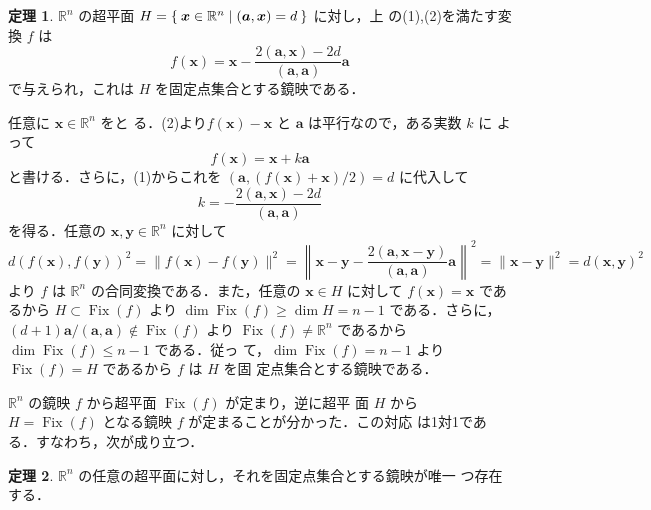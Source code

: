 \documentclass[11pt, uplatex, dvipdfmx, titlepage]{jsarticle}
\makeatletter
\DeclareMathOperator{\Fix}{Fix}
\renewenvironment{proof}[1][\proofname]{\par
  \pushQED{\qed}%
  \normalfont \topsep6\p@\@plus6\p@\relax
  \trivlist
  \item[\hskip\labelsep
         \bfseries
    {#1}]\ignorespaces
}{%
  \popQED\endtrivlist\@endpefalse
}
\theoremstyle{definition}
\newtheorem{theorem}{定理}[section]
\renewcommand{\proofname}{\textbf{証明}}
\makeatother
\begin{document}
\begin{theorem}\label{thm:ref-equation}
  $\mathbb{R}^n$ の超平面
  $H=\Set{\bm{x} \in \mathbb{R}^n | (\bm{a}, \bm{x})=d}$ に対し，上
  の(1),(2)を満たす変換 $f$ は
  \[
    f(\bm{x}) = \bm{x} - \frac{2(\bm{a}, \bm{x}) - 2d}{(\bm{a}, \bm{a})} \bm{a}
  \]
  で与えられ，これは $H$ を固定点集合とする鏡映である．
\end{theorem}
\begin{proof}
  任意に $\bm{x} \in \mathbb{R}^n$ をと
  る．(2)より$f(\bm{x})-\bm{x}$ と $\bm{a}$ は平行なので，ある実数 $k$ に
  よって
  \[
    f(\bm{x}) = \bm{x} + k \bm{a}
  \]
  と書ける．さらに，(1)からこれを $\left( \bm{a}, \left(f(\bm{x})+\bm{x}\right)/2\right)=d$ に代入して
  \[
    k = -\frac{2(\bm{a},\bm{x})-2d}{(\bm{a},\bm{a})}
  \]
  を得る．任意の $\bm{x},
  \bm{y} \in \mathbb{R}^n$ に対して
  \[
    d(f(\bm{x}), f(\bm{y}))^2 = \|f(\bm{x}) - f(\bm{y})\|^2
    = \left\|\bm{x} - \bm{y} - \frac{2\left(\bm{a}, \bm{x}-\bm{y}\right)}{(\bm{a}, \bm{a})} \bm{a}\right\|^2
    = \|\bm{x}-\bm{y}\|^2 = d(\bm{x}, \bm{y})^2
  \]
  より $f$ は $\mathbb{R}^n$ の合同変換である．また，任意の $\bm{x}
  \in H$ に対して $f(\bm{x}) = \bm{x}$ であるから $H \subset \Fix(f)$
  より $\dim \Fix(f) \geq \dim H = n-1$
  である．さらに，$(d+1)\bm{a}/(\bm{a}, \bm{a}) \notin \Fix(f)$ より $\Fix(f) \neq
  \mathbb{R}^n$ であるから $\dim \Fix(f) \leq n-1$ である．従っ
  て，$\dim\Fix(f) = n-1$ より $\Fix(f) = H$ であるから $f$ は $H$ を固
  定点集合とする鏡映である．
\end{proof}

$\mathbb{R}^n$ の鏡映 $f$ から超平面 $\Fix(f)$ が定まり，逆に超平
面 $H$ から $H=\Fix(f)$ となる鏡映 $f$ が定まることが分かった．この対応
は1対1である．すなわち，次が成り立つ．

\begin{theorem}\label{thm:ref-hyperplane}
  $\mathbb{R}^n$ の任意の超平面に対し，それを固定点集合とする鏡映が唯一
  つ存在する．
\end{theorem}
\end{document}
